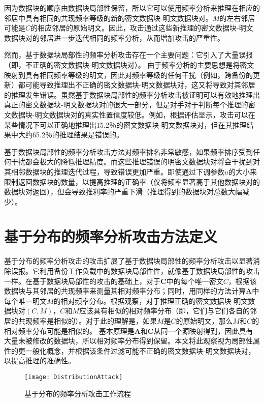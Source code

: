 因为数据块的顺序由数据块局部性保留，所以它可以使用频率分析来推理在相应的邻居中具有相同的共现频率等级的新的密文数据块-明文数据块对。$M$的左右邻居可能是$C$的相应邻居的原始明文。因此，攻击通过这些新推理的密文数据块-明文数据块对的邻居进一步迭代相同的频率分析，从而增加攻击的严重性。

然而，基于数据块局部性的频率分析攻击存在一个主要问题：它引入了大量误报（即，不正确的密文数据块-明文数据块对）。 由于频率分析的主要思想是将密文映射到具有相同频率等级的明文，因此对频率等级的任何干扰（例如，跨备份的更新）都可能导致推理出不正确的密文数据块-明文数据块对，这又将导致对其邻居的推理发生错误。虽然基于数据块局部性的频率分析攻击被证明可以有效地推理出真正的密文数据块-明文数据块对的很大一部分，但是对手对于判断每个推理的密文数据块-明文数据块对的真实性置信度较低。例如，根据评估显示，攻击可以在某些情况下可以正确地推理出15.2％的密文数据块-明文数据块对，但在其推理结果中大约65.2％的推理结果是错误的。 


基于数据块局部性的频率分析攻击方法对频率排名非常敏感，如果频率排序受到任何干扰都会极大的降低推理精度。而这些推理错误的明密文数据块对将会干扰到对其相邻数据块的推理迭代过程，导致错误更加严重。即使通过下调参数$u$的大小来限制返回数据块的数量，以提高推理的正确率（仅将频率显著高于其他数据块对的数据块对返回），但会导致推利率的严重下滑（推理得到的数据块对总数大幅减少）。

\section{基于分布的频率分析攻击方法定义}
\label{sec:distribution-attack-description}

基于分布的频率分析攻击的攻击扩展了基于数据块局部性的频率分析攻击以显著消除误报。它利用备份工作负载中的数据块局部性性，就像基于数据块局部性的攻击一样。在基于数据块局部性的攻击的基础上，对于$\mathbf{C}$中的每个唯一密文$C$，根据该数据块与其邻居的共现频率来测量其相对频率分布；同时，用同样的方法计算$\mathbf{A}$中每个唯一明文$M$的相对频率分布。根据观察，对于推理正确的密文数据块-明文数据块对$(C,M)$，$C$和$M$应该具有相似的相对频率分布（即，它们与它们各自的邻居的共现频率是相似的）。对于此的理解是，如果$M$是$C$的原始明文，那么$M$和$C$的相对频率分布可能是相似的。 基本原理是$\mathbf{A}$和$\mathbf{C}$从同一个源映射得到，因此具有大量未被修改的数据块，所以相对频率分布得到保留。本文将此观察视为局部性属性的更一般化概念，并根据该条件过滤可能不正确的密文数据块-明文数据块对，以提高推理的准确性。

\begin{figure}[!htb]
    \small
    \centering
    \texttt{[image: DistributionAttack]}
    \caption{基于分布的频率分析攻击工作流程} 
    \label{fig:基于分布的频率分析攻击工作流程}
\end{figure}

